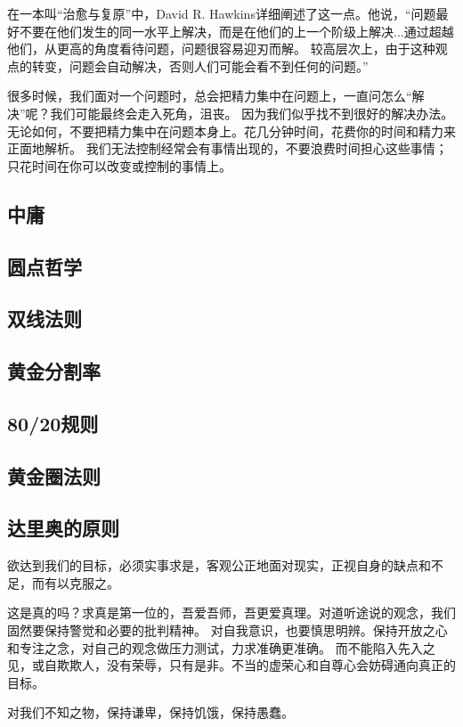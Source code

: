 在一本叫“治愈与复原”中，David R. Hawkins详细阐述了这一点。他说，“问题最好不要在他们发生的同一水平上解决，而是在他们的上一个阶级上解决...通过超越他们，从更高的角度看待问题，问题很容易迎刃而解。
较高层次上，由于这种观点的转变，问题会自动解决，否则人们可能会看不到任何的问题。”

很多时候，我们面对一个问题时，总会把精力集中在问题上，一直问怎么“解决”呢？我们可能最终会走入死角，沮丧。
因为我们似乎找不到很好的解决办法。无论如何，不要把精力集中在问题本身上。花几分钟时间，花费你的时间和精力来正面地解析。
我们无法控制经常会有事情出现的，不要浪费时间担心这些事情；只花时间在你可以改变或控制的事情上。

\subsection{中庸}

\subsection{圆点哲学}
\subsection{双线法则}
\subsection{黄金分割率}
\subsection{80/20规则}
\subsection{黄金圈法则}

\subsection{达里奥的原则}

欲达到我们的目标，必须实事求是，客观公正地面对现实，正视自身的缺点和不足，而有以克服之。

这是真的吗？求真是第一位的，吾爱吾师，吾更爱真理。对道听途说的观念，我们固然要保持警觉和必要的批判精神。
对自我意识，也要慎思明辨。保持开放之心和专注之念，对自己的观念做压力测试，力求准确更准确。
而不能陷入先入之见，或自欺欺人，没有荣辱，只有是非。不当的虚荣心和自尊心会妨碍通向真正的目标。

对我们不知之物，保持谦卑，保持饥饿，保持愚蠢。

